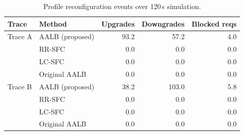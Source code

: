 \begin{table}[t]
\centering
\caption{Profile reconfiguration events over 120\,s simulation.}
\label{tab:reconfig}
\begin{tabular}{llrrr}
\toprule
Trace & Method & Upgrades & Downgrades & Blocked reqs \\
\midrule
Trace A & AALB (proposed) & 93.2 & 57.2 & 4.0 \\
 & RR-SFC & 0.0 & 0.0 & 0.0 \\
 & LC-SFC & 0.0 & 0.0 & 0.0 \\
 & Original AALB & 0.0 & 0.0 & 0.0 \\
\midrule
Trace B & AALB (proposed) & 38.2 & 103.0 & 5.8 \\
 & RR-SFC & 0.0 & 0.0 & 0.0 \\
 & LC-SFC & 0.0 & 0.0 & 0.0 \\
 & Original AALB & 0.0 & 0.0 & 0.0 \\
\bottomrule
\end{tabular}
\end{table}